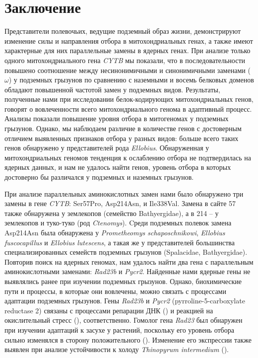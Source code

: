 
\chapter{Заключение} 

Представители полевочьих, ведущие подземный образ жизни, демонстрируют изменение силы и направления отбора в митохондриальных генах, а также имеют характерные для них параллельные замены в ядерных генах. При анализе только одного митохондриального гена \textit{CYTB} мы показали, что в последовательности повышено соотношение между несинонимичными и синонимичными заменами ($\omega$) у  подземных грызунов по сравнению с наземными и восемь белковых доменов обладают повышенной частотой замен у подземных видов. Результаты, полученные нами при исследовании белок-кодирующих митохондриальных генов, говорят о вовлеченности всего митохондриального генома в адаптивный процесс. Анализы показали повышение уровня отбора в митогеномах у подземных грызунов. Однако, мы наблюдаем различие в количестве генов с достоверным отличием выявленных признаков отбора у разных видов: больше всего таких генов обнаружено у представителей рода \textit{Ellobius}. Обнаруженная у митохондриальных геномов тенденция к ослаблению отбора не подтвердилась на ядерных данных, и нам не удалось найти генов, уровень отбора в которых достоверно бы различался у подземных и наземных грызунов. 

При анализе параллельных аминокислотных замен нами было обнаружено три замены в гене \textit{CYTB}: Ser57Pro, Asp214Asn, и Ile338Val. Замена в сайте 57 также обнаружена у землекопов (семейство Bathyergidae), а в 214 -- у землекопов и туко-туко (род \textit{Ctenomys}). Cреди подземных полевок замена Asp214Asn была обнаружена у \textit{Prometheomys schaposchnikowi}, \textit{Ellobius fuscocapillus} и \textit{Ellobius lutescens}, а такая же у представителей большинства специализированных семейств подземных грызунов (Spalacidae, Bathyergidae). Повторив поиск на ядерных геномах, нам удалось найти два гена с параллельным аминокислотными заменами: \textit{Rad23b} и \textit{Pycr2}. Найденные нами ядерные гены не выявлялись ранее при изучении подземных грызунов. Однако, биохимические пути и процессы, в которые они вовлечены, можно связать с процессами адаптации подземных грызунов. Гены \textit{Rad23b} и \textit{Pycr2} (pyrroline-5-carboxylate reductase 2) связаны с процессами репарации ДНК (\cite{Pohjoismaki2012}) и реакцией на окислительный стресс (\cite{Kuo2015}), соответственно. Гомолог гена \textit{Rad23} был обнаружен при изучении адаптаций к засухе у растений, поскольку его уровень отбора сильно изменялся в сторону положительного (\cite{Zhang2013b}). Изменение его экспрессии также выявлен при анализе устойчивости к холоду \textit{Thinopyrum intermedium} (\cite{Jaikumar2020}). 

